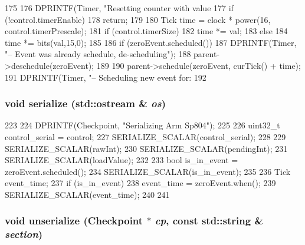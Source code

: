 \begin{DoxyCode}
175 {
176     DPRINTF(Timer, "Resetting counter with value %
177     if (!control.timerEnable)
178         return;
179 
180     Tick time = clock * power(16, control.timerPrescale);
181     if (control.timerSize)
182         time *= val;
183     else
184         time *= bits(val,15,0);
185 
186     if (zeroEvent.scheduled()) {
187         DPRINTF(Timer, "-- Event was already schedule, de-scheduling\n");
188         parent->deschedule(zeroEvent);
189     }
190     parent->schedule(zeroEvent, curTick() + time);
191     DPRINTF(Timer, "-- Scheduling new event for: %
192 }
\end{DoxyCode}
\hypertarget{classSp804_1_1Timer_a53e036786d17361be4c7320d39c99b84}{
\subsubsection[{serialize}]{\setlength{\rightskip}{0pt plus 5cm}void serialize (std::ostream \& {\em os})}}
\label{classSp804_1_1Timer_a53e036786d17361be4c7320d39c99b84}



\begin{DoxyCode}
223 {
224     DPRINTF(Checkpoint, "Serializing Arm Sp804\n");
225 
226     uint32_t control_serial = control;
227     SERIALIZE_SCALAR(control_serial);
228 
229     SERIALIZE_SCALAR(rawInt);
230     SERIALIZE_SCALAR(pendingInt);
231     SERIALIZE_SCALAR(loadValue);
232 
233     bool is_in_event = zeroEvent.scheduled();
234     SERIALIZE_SCALAR(is_in_event);
235 
236     Tick event_time;
237     if (is_in_event){
238         event_time = zeroEvent.when();
239         SERIALIZE_SCALAR(event_time);
240     }
241 }
\end{DoxyCode}
\hypertarget{classSp804_1_1Timer_af22e5d6d660b97db37003ac61ac4ee49}{
\subsubsection[{unserialize}]{\setlength{\rightskip}{0pt plus 5cm}void unserialize ({\bf Checkpoint} $\ast$ {\em cp}, \/  const std::string \& {\em section})}}
\label{classSp804_1_1Timer_af22e5d6d660b97db37003ac61ac4ee49}



